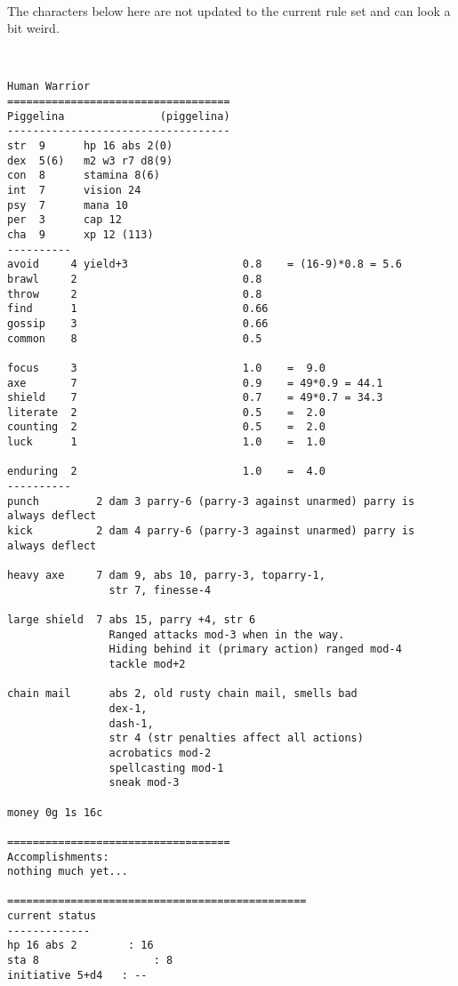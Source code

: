 \


\newpage
{}
The characters below here are not updated to the current rule set and can look a bit weird.


\


\pagebreak[3]
\tiny \begin{samepage} \begin{verbatim}
Human Warrior
===================================
Piggelina               (piggelina)
-----------------------------------
str  9      hp 16 abs 2(0)
dex  5(6)   m2 w3 r7 d8(9)
con  8      stamina 8(6)
int  7      vision 24
psy  7      mana 10
per  3      cap 12
cha  9      xp 12 (113)
----------
avoid     4 yield+3                  0.8    = (16-9)*0.8 = 5.6
brawl     2                          0.8
throw     2                          0.8
find      1                          0.66
gossip    3                          0.66
common    8                          0.5

focus     3                          1.0    =  9.0
axe       7                          0.9    = 49*0.9 = 44.1
shield    7                          0.7    = 49*0.7 = 34.3
literate  2                          0.5    =  2.0
counting  2                          0.5    =  2.0
luck      1                          1.0    =  1.0

enduring  2                          1.0    =  4.0
----------
punch         2 dam 3 parry-6 (parry-3 against unarmed) parry is always deflect
kick          2 dam 4 parry-6 (parry-3 against unarmed) parry is always deflect

heavy axe     7 dam 9, abs 10, parry-3, toparry-1,
                str 7, finesse-4

large shield  7 abs 15, parry +4, str 6
                Ranged attacks mod-3 when in the way.
                Hiding behind it (primary action) ranged mod-4
                tackle mod+2

chain mail      abs 2, old rusty chain mail, smells bad
                dex-1,
                dash-1,
                str 4 (str penalties affect all actions)
                acrobatics mod-2
                spellcasting mod-1
                sneak mod-3

money 0g 1s 16c

===================================
Accomplishments:
nothing much yet...

===============================================
current status
-------------
hp 16 abs 2        : 16
sta 8                  : 8
initiative 5+d4   : --
\end{verbatim} \end{samepage} \normalsize


